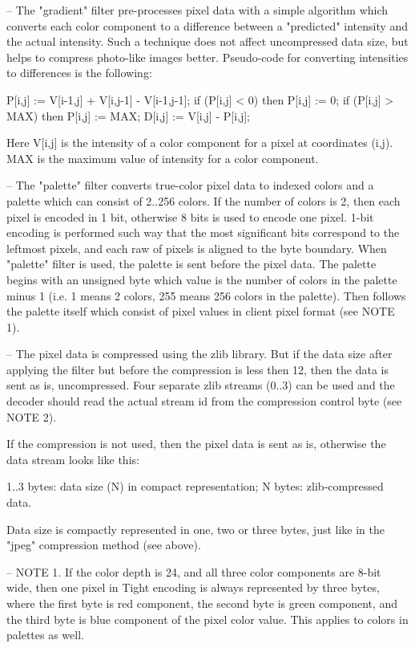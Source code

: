 \documentclass[a4paper]{article}
\begin{document}
-- The "gradient" filter pre-processes pixel data with a simple algorithm
 which converts each color component to a difference between a "predicted"
 intensity and the actual intensity. Such a technique does not affect
 uncompressed data size, but helps to compress photo-like images better. 
 Pseudo-code for converting intensities to differences is the following:

   P[i,j] := V[i-1,j] + V[i,j-1] - V[i-1,j-1];
   if (P[i,j] < 0) then P[i,j] := 0;
   if (P[i,j] > MAX) then P[i,j] := MAX;
   D[i,j] := V[i,j] - P[i,j];

 Here V[i,j] is the intensity of a color component for a pixel at
 coordinates (i,j). MAX is the maximum value of intensity for a color
 component.

-- The "palette" filter converts true-color pixel data to indexed colors
 and a palette which can consist of 2..256 colors. If the number of colors
 is 2, then each pixel is encoded in 1 bit, otherwise 8 bits is used to
 encode one pixel. 1-bit encoding is performed such way that the most
 significant bits correspond to the leftmost pixels, and each raw of pixels
 is aligned to the byte boundary. When "palette" filter is used, the
 palette is sent before the pixel data. The palette begins with an unsigned
 byte which value is the number of colors in the palette minus 1 (i.e. 1
 means 2 colors, 255 means 256 colors in the palette). Then follows the
 palette itself which consist of pixel values in client pixel format (see
 NOTE 1).

-- The pixel data is compressed using the zlib library. But if the data
 size after applying the filter but before the compression is less then 12,
 then the data is sent as is, uncompressed. Four separate zlib streams
 (0..3) can be used and the decoder should read the actual stream id from
 the compression control byte (see NOTE 2).

 If the compression is not used, then the pixel data is sent as is,
 otherwise the data stream looks like this:

   1..3 bytes:  data size (N) in compact representation;
   N bytes:     zlib-compressed data.

 Data size is compactly represented in one, two or three bytes, just like
 in the "jpeg" compression method (see above).

-- NOTE 1. If the color depth is 24, and all three color components are
 8-bit wide, then one pixel in Tight encoding is always represented by
 three bytes, where the first byte is red component, the second byte is
 green component, and the third byte is blue component of the pixel color
 value. This applies to colors in palettes as well.
\end{document}
